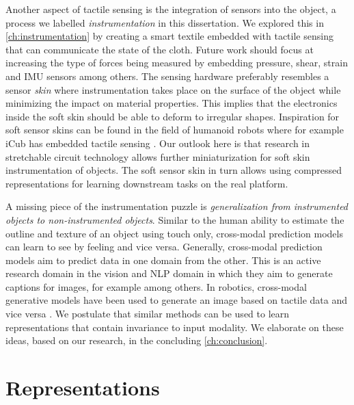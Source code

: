 \documentclass[\home/main.tex]{subfiles}
\begin{document}
Another aspect of tactile sensing is the integration of sensors into the object, a process we labelled \textit{instrumentation} in this dissertation. 
We explored this in \cref{ch:instrumentation} by creating a smart textile embedded with tactile sensing that can communicate the state of the cloth. Future work should focus at increasing the type of forces being measured by embedding pressure, shear, strain and IMU sensors among others. The sensing hardware preferably resembles a sensor \emph{skin} where instrumentation takes place on the surface of the object while minimizing the impact on material properties. This implies that the electronics inside the soft skin should be able to deform to irregular shapes. Inspiration for soft sensor skins can be found in the field of humanoid robots where for example iCub has embedded tactile sensing \autocite{Tomo2018}. Our outlook here is that research in stretchable circuit technology allows further miniaturization for soft skin instrumentation of objects. The soft sensor skin in turn allows using compressed representations for learning downstream tasks on the real platform. 

A missing piece of the instrumentation puzzle is \emph{generalization from instrumented objects to non-instrumented objects}. Similar to the human ability to estimate the outline and texture of an object using touch only, cross-modal prediction models can learn to see by feeling and vice versa. Generally, cross-modal prediction models aim to predict data in one domain from the other. This is an active research domain in the vision and NLP domain in which they aim to generate captions for images, for example \autocite{donahue2015long} among others. In robotics, cross-modal generative models have been used to generate an image based on tactile data and vice versa \autocite{Li2019}. We postulate that similar methods can be used to learn representations that contain invariance to input modality. We elaborate on these ideas, based on our research, in the concluding \cref{ch:conclusion}. 

\section{Representations} \label{sec:towards_sensing_representation}
\end{document}
